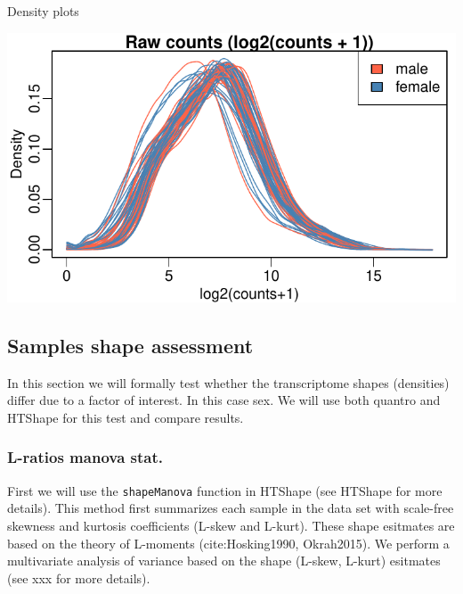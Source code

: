 \documentclass{article}\usepackage[]{graphicx}\usepackage[usenames,dvipsnames]{color}
\makeatletter
\def\maxwidth{ %
  \ifdim\Gin@nat@width>\linewidth
    \linewidth
  \else
    \Gin@nat@width
  \fi
}
\newenvironment{knitrout}{}{} %
\makeatother
\begin{document}
Density plots
\begin{knitrout}
\color{fgcolor}

{\centering \includegraphics[width=\maxwidth]{figure/density-1} 

}



\end{knitrout}

\subsection{Samples shape assessment}

In this section we will formally test whether the transcriptome
shapes (densities) differ due to a factor of interest. In this case
sex. We will use both quantro and HTShape for this test and compare results.

\subsubsection{L-ratios manova stat.}

First we will use the \texttt{shapeManova} function in HTShape 
(see HTShape for more details). This method first summarizes each
sample in the data set with scale-free skewness and kurtosis coefficients
(L-skew and L-kurt). These shape esitmates are based on the theory of L-moments 
(cite:Hosking1990, Okrah2015). We perform a multivariate analysis of 
variance based on the shape (L-skew, L-kurt) esitmates
(see xxx for more details).
\end{document}
